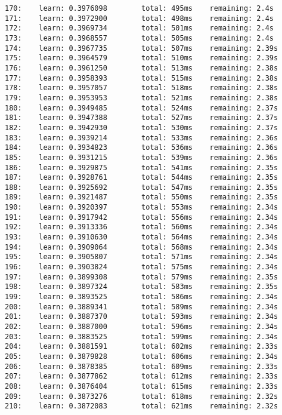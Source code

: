 \documentclass[11pt]{article}
\begin{document}
\begin{Verbatim}[commandchars=\\\{\}]
170:    learn: 0.3976098        total: 495ms    remaining: 2.4s
171:    learn: 0.3972900        total: 498ms    remaining: 2.4s
172:    learn: 0.3969734        total: 501ms    remaining: 2.4s
173:    learn: 0.3968557        total: 505ms    remaining: 2.4s
174:    learn: 0.3967735        total: 507ms    remaining: 2.39s
175:    learn: 0.3964579        total: 510ms    remaining: 2.39s
176:    learn: 0.3961250        total: 513ms    remaining: 2.38s
177:    learn: 0.3958393        total: 515ms    remaining: 2.38s
178:    learn: 0.3957057        total: 518ms    remaining: 2.38s
179:    learn: 0.3953953        total: 521ms    remaining: 2.38s
180:    learn: 0.3949485        total: 524ms    remaining: 2.37s
181:    learn: 0.3947388        total: 527ms    remaining: 2.37s
182:    learn: 0.3942930        total: 530ms    remaining: 2.37s
183:    learn: 0.3939214        total: 533ms    remaining: 2.36s
184:    learn: 0.3934823        total: 536ms    remaining: 2.36s
185:    learn: 0.3931215        total: 539ms    remaining: 2.36s
186:    learn: 0.3929875        total: 541ms    remaining: 2.35s
187:    learn: 0.3928761        total: 544ms    remaining: 2.35s
188:    learn: 0.3925692        total: 547ms    remaining: 2.35s
189:    learn: 0.3921487        total: 550ms    remaining: 2.35s
190:    learn: 0.3920397        total: 553ms    remaining: 2.34s
191:    learn: 0.3917942        total: 556ms    remaining: 2.34s
192:    learn: 0.3913336        total: 560ms    remaining: 2.34s
193:    learn: 0.3910630        total: 564ms    remaining: 2.34s
194:    learn: 0.3909064        total: 568ms    remaining: 2.34s
195:    learn: 0.3905807        total: 571ms    remaining: 2.34s
196:    learn: 0.3903824        total: 575ms    remaining: 2.34s
197:    learn: 0.3899308        total: 579ms    remaining: 2.35s
198:    learn: 0.3897324        total: 583ms    remaining: 2.35s
199:    learn: 0.3893525        total: 586ms    remaining: 2.34s
200:    learn: 0.3889341        total: 589ms    remaining: 2.34s
201:    learn: 0.3887370        total: 593ms    remaining: 2.34s
202:    learn: 0.3887000        total: 596ms    remaining: 2.34s
203:    learn: 0.3883525        total: 599ms    remaining: 2.34s
204:    learn: 0.3881591        total: 602ms    remaining: 2.33s
205:    learn: 0.3879828        total: 606ms    remaining: 2.34s
206:    learn: 0.3878385        total: 609ms    remaining: 2.33s
207:    learn: 0.3877862        total: 612ms    remaining: 2.33s
208:    learn: 0.3876404        total: 615ms    remaining: 2.33s
209:    learn: 0.3873276        total: 618ms    remaining: 2.32s
210:    learn: 0.3872083        total: 621ms    remaining: 2.32s

\end{Verbatim}
\end{document}
